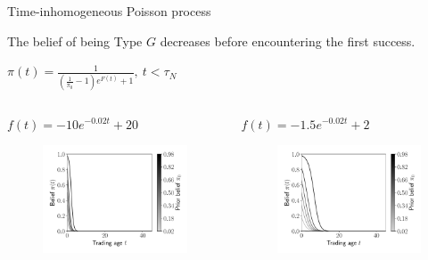 \documentclass{beamer}
\begin{document}
\begin{frame}[allowframebreaks]{Time-inhomogeneous Poisson process}
\framebreak

The belief of being Type $G$ decreases before encountering the first success.

$\pi(t) = \frac{1}{(\frac{1}{\pi_0}-1) e^{F(t)}+1},\ t<\tau_N$

\begin{columns}[t]
	\begin{column}{0.49\textwidth}
		\begin{block}{$f(t)=-10e^{-0.02t}+20$}
			\begin{figure}
				\includegraphics[width=\linewidth]{figures/pis2}
			\end{figure}
		\end{block}
	\end{column}

	\begin{column}{0.49\textwidth}
		\begin{block}{$f(t)=-1.5e^{-0.02t}+2$}
			\begin{figure}
				\includegraphics[width=\linewidth]{figures/pis1}
			\end{figure}
		\end{block}
	\end{column}
\end{columns}

\end{frame}
\end{document}
